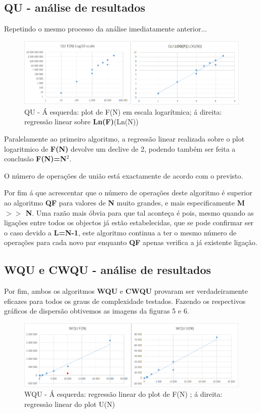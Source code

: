 \documentclass[10pt,a4paper]{article}
\begin{document}
\subsection{QU - análise de resultados}
\par Repetindo o mesmo processo da análise imediatamente anterior...

\begin{figure}[h!]
\includegraphics[scale=0.4]{QUgraphs.png}
\caption{QU - Á esquerda: plot de F(N) em escala logarítmica; á direita: regressão linear sobre \textbf{Ln(F)}(Ln(N)) }
\end{figure}
\par Paralelamente ao primeiro algoritmo, a regressão linear realizada sobre o plot logaritmico de \textbf{F(N)} devolve um declive de 2, podendo também ser feita a conclusão \textbf{F(N)=N$^2$}.
\par O número de operações de união está exactamente de acordo com o previsto.
\par Por fim á que acrescentar que o número de operações deste algoritmo é superior ao algoritmo \textbf{QF} para valores de \textbf{N} muito grandes, e mais especificamente \textbf{M $>>$ N}. Uma razão mais óbvia para que tal aconteça é pois, mesmo quando as ligações entre todos os objectos já estão estabelecidas, que se pode confirmar ser o caso devido a \textbf{L=N-1}, este algoritmo continua a ter o mesmo número de operações para cada novo par enquanto \textbf{QF} apenas verifica a já existente ligação.

\subsection{WQU e CWQU - análise de resultados}
\par Por fim, ambos os algoritmos \textbf{WQU} e \textbf{CWQU} provaram ser verdadeiramente eficazes para todos os graus de complexidade testados. Fazendo os respectivos gráficos de dispersão obtivemos as imagens da figuras 5 e 6.

\begin{figure}[h!]
\includegraphics[scale=0.35]{WQUgraphs.png}
\caption{WQU - Á esquerda: regressão linear do plot de F(N) ; á direita: regressão linear do plot U(N) }
\end{figure}
\end{document}
